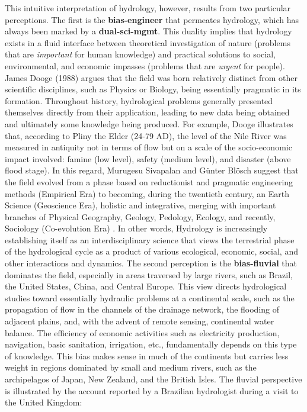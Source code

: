 \documentclass[./main_en.tex]{subfiles}
\begin{document}
\par This intuitive interpretation of \gls{hydrology}, however, results from two particular perceptions. The first is the \textbf{\gls{bias-engineer}} that permeates \gls{hydrology}, which has always been marked by a \textbf{\gls{dual-sci-mgmt}}. This duality implies that \gls{hydrology} exists in a fluid interface between theoretical investigation of nature (problems that are \textit{important} for human knowledge) and practical solutions to social, environmental, and economic impasses (problems that are \textit{urgent} for people). James Dooge (1988) \cite{Dooge1988} argues that the field was born relatively distinct from other scientific disciplines, such as Physics or Biology, being essentially pragmatic in its formation. Throughout history, hydrological problems generally presented themselves directly from their application, leading to new data being obtained and ultimately some knowledge being produced. For example, Dooge illustrates that, according to Pliny the Elder (24-79 AD), the level of the Nile River was measured in antiquity not in terms of flow but on a scale of the socio-economic impact involved: famine (low level), safety (medium level), and disaster (above flood stage). In this regard, Murugesu Sivapalan and Günter Blösch suggest that the field evolved from a phase based on reductionist and pragmatic engineering methods (Empirical Era) to becoming, during the twentieth century, an Earth Science (Geoscience Era), holistic and integrative, merging with important branches of Physical Geography, Geology, Pedology, Ecology, and recently, Sociology (Co-evolution Era) \cite{Sivapalan2017, Sivapalan2018}. In other words, Hydrology is increasingly establishing itself as an interdisciplinary science that views the terrestrial phase of the hydrological cycle as a product of various ecological, economic, social, and other interactions and dynamics. The second perception is the \textbf{\gls{bias-fluvial}} that dominates the field, especially in areas traversed by large rivers, such as Brazil, the United States, China, and Central Europe. This view directs hydrological studies toward essentially hydraulic problems at a continental scale, such as the propagation of flow in the channels of the drainage network, the flooding of adjacent plains, and, with the advent of remote sensing, continental water balance. The efficiency of economic activities such as electricity production, navigation, basic sanitation, irrigation, etc., fundamentally depends on this type of knowledge. This bias makes sense in much of the continents but carries less weight in regions dominated by small and medium rivers, such as the archipelagos of Japan, New Zealand, and the British Isles. The fluvial perspective is illustrated by the account reported by a Brazilian hydrologist during a visit to the United Kingdom:
\end{document}
